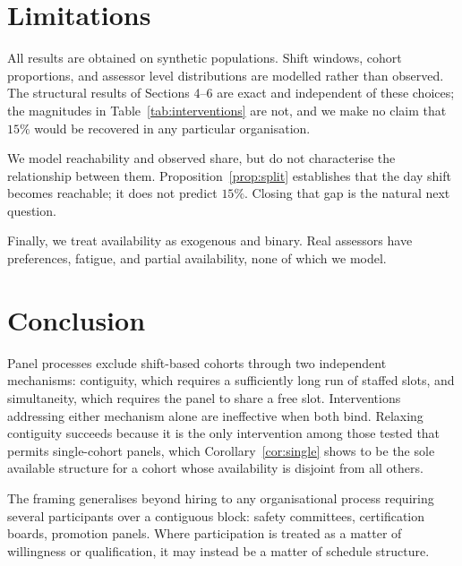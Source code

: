 \documentclass[11pt]{article}
\theoremstyle{definition}
\begin{document}
\section{Limitations}

All results are obtained on synthetic populations. Shift windows, cohort proportions, and
assessor level distributions are modelled rather than observed. The structural results of
Sections 4--6 are exact and independent of these choices; the magnitudes in
Table~\ref{tab:interventions} are not, and we make no claim that $15\%$ would be recovered
in any particular organisation.

We model reachability and observed share, but do not characterise the relationship between
them. Proposition~\ref{prop:split} establishes that the day shift becomes reachable; it
does not predict $15\%$. Closing that gap is the natural next question.

Finally, we treat availability as exogenous and binary. Real assessors have preferences,
fatigue, and partial availability, none of which we model.

\section{Conclusion}

Panel processes exclude shift-based cohorts through two independent mechanisms:
contiguity, which requires a sufficiently long run of staffed slots, and simultaneity,
which requires the panel to share a free slot. Interventions addressing either mechanism
alone are ineffective when both bind. Relaxing contiguity succeeds because it is the only
intervention among those tested that permits single-cohort panels, which
Corollary~\ref{cor:single} shows to be the sole available structure for a cohort whose
availability is disjoint from all others.

The framing generalises beyond hiring to any organisational process requiring several
participants over a contiguous block: safety committees, certification boards, promotion
panels. Where participation is treated as a matter of willingness or qualification, it may
instead be a matter of schedule structure.
\end{document}
